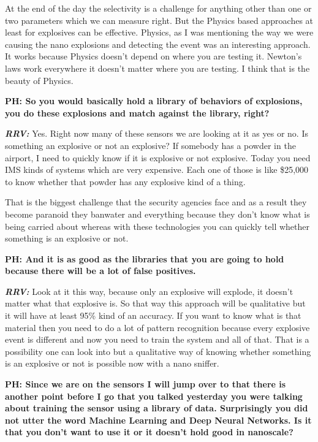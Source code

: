 \begin{multicols}{2}
At the end of the day the selectivity is a challenge for anything other than one or two parameters which we can measure right. But the Physics based approaches at least for explosives can be effective. Physics, as I was mentioning the way we were causing the nano explosions and detecting the event was an interesting approach. It works because Physics doesn’t depend on where you are testing it. Newton’s laws work everywhere it doesn’t matter where you are testing. I think that is the beauty of Physics.

\textbf{PH: So you would basically hold a library of behaviors of explosions, you do these explosions and match against the library, right?}

\textbf{\textit{RRV:}} Yes. Right now many of these sensors we are looking at it as yes or no. Is something an explosive or not an explosive? If somebody has a powder in the airport, I need to quickly know if it is explosive or not explosive. Today you need IMS kinds of systems which are very expensive. Each one of those is like \$25,000 to know whether that powder has any explosive kind of a thing.

That is the biggest challenge that the security agencies face and as a result they become paranoid they ban\break water and everything because they don’t know what is being carried about whereas with these technologies you can quickly tell whether something is an explosive or not.

\textbf{PH: And it is as good as the libraries that you are going to hold because there will be a lot of false positives.}

\textbf{\textit{RRV:}} Look at it this way, because only an explosive will explode, it doesn’t matter what that explosive is. So that way this approach will be qualitative but it will have at least 95\% kind of an accuracy. If you want to know what is that material then you need to do a lot of pattern recognition because every explosive event is different and now you need to train the system and all of that. That is a possibility one can look into but a qualitative way of knowing whether something is an explosive or not is possible now with a nano sniffer.

\textbf{PH: Since we are on the sensors I will jump over to that there is another point before I go that you talked yesterday you were talking about training the sensor using a library of data. Surprisingly you did not utter the word Machine Learning and Deep Neural Networks. Is it that you don’t want to use it or it doesn’t hold good in nanoscale? }


\end{multicols}
